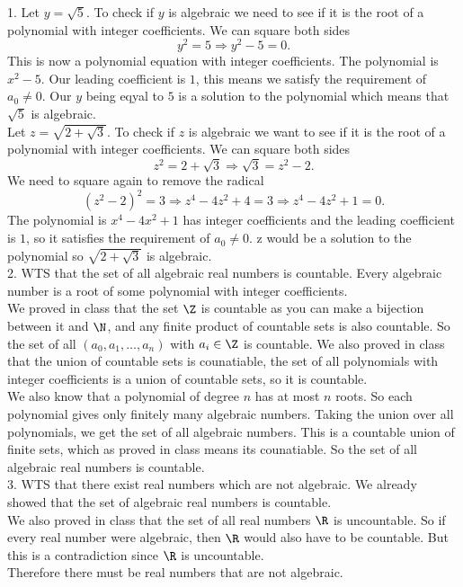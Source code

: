\documentclass{report}
\begin{document}
\begin{proofWithHibiscus}
  1. Let $y = \sqrt{5}$. To check if $y$ is algebraic we need to see if it is the root of a polynomial with integer coefficients. 
  We can square both sides
  \[
    y^2 = 5 \Rightarrow
    y^2 - 5 = 0.
  \]
  This is now a polynomial equation with integer coefficients. The polynomial is $x^2 - 5$. 
  Our leading coefficient is $1$,  this means we satisfy the requirement of $a_{0} \neq 0$. 
  Our $y$ being eqyal to $5$ is a solution to the polynomial which means that $\sqrt{5}$ is algebraic. \\ 


  Let $z = \sqrt{2+\sqrt{3}}$. To check if $z$ is algebraic we want to see if it is the root of a polynomial with integer coefficients. 
  We can square both sides
  \[
    z^2 = 2 + \sqrt{3} \Rightarrow
    \sqrt{3} = z^2 - 2.
  \]
  We need to square again to remove the radical 
  \[
    (z^2 - 2)^2 = 3 \Rightarrow
    z^4 - 4z^2 + 4 = 3 \Rightarrow 
    z^4 - 4z^2 + 1 = 0.
  \]
  The polynomial is $x^4 - 4x^2 + 1$ has integer coefficients and the leading
  coefficient is $1$, so it satisfies the requirement of $a_0 \neq 0$. 
  z would be a solution to the polynomial so $\sqrt{2+\sqrt{3}}$ is algebraic.  \\

  2. WTS that the set of all algebraic real numbers is countable. 
  Every algebraic number is a root of some polynomial with integer coefficients. \\

  We proved in class that the set $\Z$ is countable as you can make a bijection between it and $\N$, and any finite product of countable sets is also countable. 
  So the set of all $(a_0,a_1,\dots,a_n)$ with $a_i\in\Z$ is countable. 
  We also proved in class that the union of countable sets is counatiable, the set of all polynomials with integer coefficients is a union of countable sets, so it is countable. \\

  We also know that a polynomial of degree $n$ has at most $n$ roots. 
  So each polynomial gives only finitely many algebraic numbers. 
  Taking the union over all polynomials, we get the set of all algebraic numbers. 
  This is a countable union of finite sets, which as proved in class means its counatiable. 
  So the set of all algebraic real numbers is countable. \\

  3. WTS that there exist real numbers which are not algebraic. 
  We already showed that the set of algebraic real numbers is countable. \\
  
  We also proved in class that the set of all real numbers $\R$ is uncountable. 
  So if every real number were algebraic, then $\R$ would also have to be countable. 
  But this is a contradiction since $\R$ is uncountable. \\
  
  Therefore there must be real numbers that are not algebraic. 
\end{proofWithHibiscus}
\end{document}

